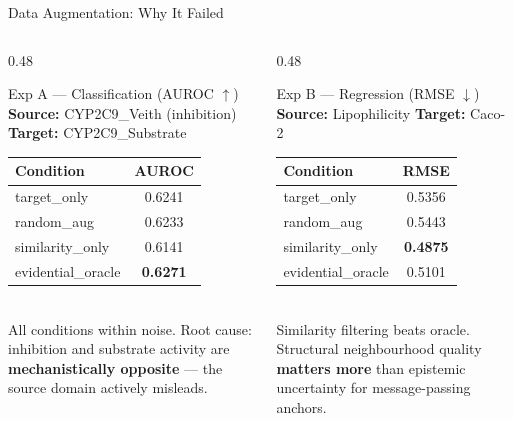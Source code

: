 \documentclass[aspectratio=169]{beamer}
\begin{document}
\begin{frame}[t]{Data Augmentation: Why It Failed}
\begin{columns}[T]
\begin{column}{0.48\textwidth}
\begin{alertblock}{Exp A — Classification (AUROC $\uparrow$)}
\footnotesize
\textbf{Source:} CYP2C9\_Veith (inhibition) \quad \textbf{Target:} CYP2C9\_Substrate\\[3pt]
\begin{tabular}{lc}
\toprule
Condition & AUROC \\
\midrule
target\_only    & 0.6241 \\
random\_aug     & 0.6233 \\
similarity\_only & 0.6141 \\
evidential\_oracle & \textbf{0.6271} \\
\bottomrule
\end{tabular}\\[4pt]
\alert{All conditions within noise.} Root cause: inhibition and substrate activity are \textbf{mechanistically opposite} — the source domain actively misleads.
\end{alertblock}
\end{column}
\begin{column}{0.48\textwidth}
\begin{alertblock}{Exp B — Regression (RMSE $\downarrow$)}
\footnotesize
\textbf{Source:} Lipophilicity \quad \textbf{Target:} Caco-2\\[3pt]
\begin{tabular}{lc}
\toprule
Condition & RMSE \\
\midrule
target\_only     & 0.5356 \\
random\_aug      & 0.5443 \\
similarity\_only & \textbf{0.4875} \\
evidential\_oracle & 0.5101 \\
\bottomrule
\end{tabular}\\[4pt]
Similarity filtering beats oracle. Structural neighbourhood quality \textbf{matters more} than epistemic uncertainty for message-passing anchors.
\end{alertblock}
\end{column}
\end{columns}
\vspace{4pt}
\begin{center}
\footnotesize
\end{center}
\end{frame}
\end{document}

